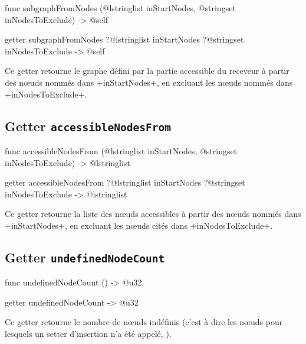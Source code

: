 \begin{galgas4}
func subgraphFromNodes (@lstringlist inStartNodes,
                        @stringset inNodesToExclude) -> @self
\end{galgas4}

\begin{galgas4}
getter subgraphFromNodes ?@lstringlist inStartNodes
                         ?@stringset inNodesToExclude -> @self
\end{galgas4}

Ce getter retourne le graphe défini par la partie accessible du receveur à partir des nœuds nommés dans \ggsq+inStartNodes+, en excluant les nœuds nommés dans \ggsq+inNodesToExclude+.






\subsection{Getter \texttt{accessibleNodesFrom}}

\begin{galgas4}
func accessibleNodesFrom (@lstringlist inStartNodes,
                          @stringset inNodesToExclude) -> @lstringlist
\end{galgas4}

\begin{galgas4}
getter accessibleNodesFrom ?@lstringlist inStartNodes
                           ?@stringset inNodesToExclude -> @lstringlist
\end{galgas4}

Ce getter retourne la liste des nœuds accessibles à partir des nœuds nommés dans \ggsq+inStartNodes+, en excluant les nœuds cités dans \ggsq+inNodesToExclude+.






\subsection{Getter \texttt{undefinedNodeCount}}

\begin{galgas4}
func undefinedNodeCount () -> @u32
\end{galgas4}

\begin{galgas4}
getter undefinedNodeCount -> @u32
\end{galgas4}

Ce getter retourne le nombre de nœuds indéfinis (c'est à dire les nœuds pour lesquels un setter d'insertion n'a été appelé, ).







